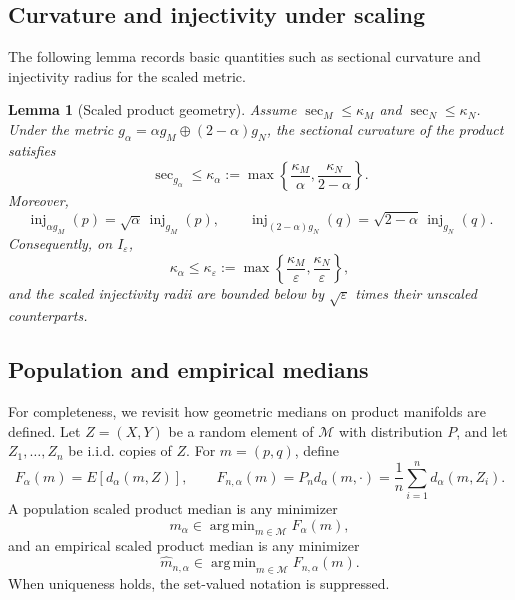 \documentclass[11pt]{article}
\newtheorem{lemma}[theorem]{Lemma}
\DeclareMathOperator*{\argmin}{arg\,min}
\DeclareMathOperator{\inj}{inj}
\DeclareMathOperator{\secop}{sec}
\newcommand{\M}{\mathcal M}
\newcommand{\eps}{\varepsilon}
\newcommand{\1}{\mathbf{1}}
\begin{document}
\subsection{Curvature and injectivity under scaling}

The following lemma records basic quantities such as sectional curvature and injectivity radius for the scaled metric.

\begin{lemma}[Scaled product geometry]\label{lem:scaled-geometry}
Assume $\secop_M\le \kappa_M$ and $\secop_N\le \kappa_N$.  Under the metric $g_\alpha=\alpha g_M\oplus(2-\alpha)g_N$, the sectional curvature of the product satisfies
\[
 \secop_{g_\alpha}\le
 \kappa_\alpha
 :=
 \max\left\{
 \frac{\kappa_M}{\alpha},
 \frac{\kappa_N}{2-\alpha}
 \right\}.
\]
Moreover,
\[
 \inj_{\alpha g_M}(p)=\sqrt\alpha\,\inj_{g_M}(p),
 \qquad
 \inj_{(2-\alpha)g_N}(q)=\sqrt{2-\alpha}\,\inj_{g_N}(q).
\]
Consequently, on $I_\eps$,
\[
 \kappa_\alpha\le
 \kappa_\eps:=\max\left\{\frac{\kappa_M}{\eps},\frac{\kappa_N}{\eps}\right\},
\]
and the scaled injectivity radii are bounded below by $\sqrt\eps$ times their unscaled counterparts.
\end{lemma}



\subsection{Population and empirical medians}

For completeness, we revisit how geometric medians on product manifolds are defined. 
Let $Z=(X,Y)$ be a random element of $\M$ with distribution $P$, and let $Z_1,\ldots,Z_n$ be i.i.d. copies of $Z$.  For $m=(p,q)$,  define
\begin{equation}\label{eq:Falpha}
 F_\alpha(m)=E[d_\alpha(m,Z)],
 \qquad
 F_{n,\alpha}(m)=P_n d_\alpha(m,\cdot)=\frac1n\sum_{i=1}^n d_\alpha(m,Z_i).
\end{equation}
A population scaled product median is any minimizer
\[
 m_\alpha\in\argmin_{m\in\M}F_\alpha(m),
\]
and an empirical scaled product median is any minimizer
\[
 \widehat m_{n,\alpha}\in\argmin_{m\in\M}F_{n,\alpha}(m).
\]
When uniqueness holds, the set-valued notation is suppressed.
\end{document}
